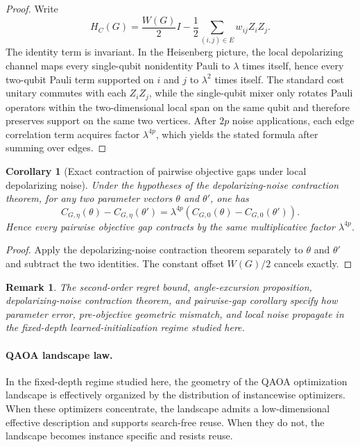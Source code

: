 \documentclass[
  reprint,
  twocolumn,
  aps,
  superscriptaddress,
  longbibliography,
  floatfix
]{revtex4-2}
\newtheorem{corollary}{Corollary}
\newtheorem{remark}{Remark}
\begin{document}
\begin{proof}
Write
\begin{equation}
H_C(G) = \frac{W(G)}{2}I - \frac{1}{2}\sum_{(i,j)\in E} w_{ij} Z_i Z_j.
\end{equation}
The identity term is invariant. In the Heisenberg picture, the local depolarizing channel maps every single-qubit nonidentity Pauli to $\lambda$ times itself, hence every two-qubit Pauli term supported on $i$ and $j$ to $\lambda^2$ times itself. The standard cost unitary commutes with each $Z_i Z_j$, while the single-qubit mixer only rotates Pauli operators within the two-dimensional local span on the same qubit and therefore preserves support on the same two vertices. After $2p$ noise applications, each edge correlation term acquires factor $\lambda^{4p}$, which yields the stated formula after summing over edges.
\end{proof}

\begin{corollary}[Exact contraction of pairwise objective gaps under local depolarizing noise]
Under the hypotheses of the depolarizing-noise contraction theorem, for any two parameter vectors $\theta$ and $\theta'$, one has
\begin{equation}
C_{G,\eta}(\theta) - C_{G,\eta}(\theta') = \lambda^{4p}\left(C_{G,0}(\theta) - C_{G,0}(\theta')\right).
\end{equation}
Hence every pairwise objective gap contracts by the same multiplicative factor $\lambda^{4p}$.
\end{corollary}

\begin{proof}
Apply the depolarizing-noise contraction theorem separately to $\theta$ and $\theta'$ and subtract the two identities. The constant offset $W(G)/2$ cancels exactly.
\end{proof}

\begin{remark}
The second-order regret bound, angle-excursion proposition, depolarizing-noise contraction theorem, and pairwise-gap corollary specify how parameter error, pre-objective geometric mismatch, and local noise propagate in the fixed-depth learned-initialization regime studied here.
\end{remark}

\paragraph{QAOA landscape law.}
In the fixed-depth regime studied here, the geometry of the QAOA optimization landscape is effectively organized by the distribution of instancewise optimizers. When these optimizers concentrate, the landscape admits a low-dimensional effective description and supports search-free reuse. When they do not, the landscape becomes instance specific and resists reuse.
\end{document}
